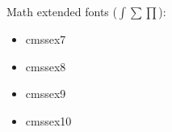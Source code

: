 \documentclass{amsart}
\begin{document}
\bigskip


Math extended fonts ($\int \sum \prod$):

\nobreak

\noindent{}\textwidth\parbox[t]{0.235\textwidth}{
\begin{itemize}[leftmargin=*]
\item \textsf{cmssex7}
\end{itemize}}\parbox[t]{0.235\textwidth}{\begin{itemize}[leftmargin=*]
\item \textsf{cmssex8}
\end{itemize}}\parbox[t]{0.235\textwidth}{\begin{itemize}[leftmargin=*]
\item \textsf{cmssex9}
\end{itemize}}\parbox[t]{0.235\textwidth}{\begin{itemize}[leftmargin=*]
\item \textsf{cmssex10}
\end{itemize}}

\bigskip

\end{document}

